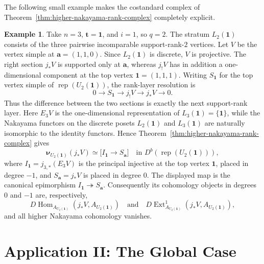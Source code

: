 \documentclass[12pt,reqno]{amsart}
\theoremstyle{definition}
\newtheorem{example}[theorem]{Example}
\theoremstyle{remark}
\newcommand{\Rep}{\operatorname{rep}}
\newcommand{\Hom}{\operatorname{Hom}}
\newcommand{\Ext}{\operatorname{Ext}}
\begin{document}
The following small example makes the costandard complex of
Theorem~\ref{thm:higher-nakayama-rank-complex} completely explicit.

\begin{example}\label{ex:rank-layer-three}
Take $n=3$, $\mathbf t=\mathbf1$, and $i=1$, so $q=2$.  The stratum
$L_2(\mathbf1)$ consists of the three pairwise incomparable support-rank-$2$
vertices.  Let $V$ be the vertex simple at $\mathbf a=(1,1,0)$.  Since
$L_2(\mathbf1)$ is discrete, $V$ is projective.  The right section $j_*V$ is
supported only at $\mathbf a$, whereas $j_!V$ has in addition a
one-dimensional component at the top vertex $\mathbf1=(1,1,1)$.  Writing
$S_{\mathbf1}$ for the top vertex simple of $\Rep(U_2(\mathbf1))$, the
rank-layer resolution is
\[
0\longrightarrow S_{\mathbf1}\longrightarrow j_!V
\longrightarrow j_*V\longrightarrow0.
\]
Thus the difference between the two sections is exactly the next support-rank
layer.  Here $E_3V$ is the one-dimensional representation of
$L_3(\mathbf1)=\{\mathbf1\}$, while the Nakayama functors on the discrete
posets $L_2(\mathbf1)$ and $L_3(\mathbf1)$ are naturally isomorphic to the
identity functors.  Hence
Theorem~\ref{thm:higher-nakayama-rank-complex} gives
\[
\boldsymbol\nu_{U_2(\mathbf1)}(j_*V)
\simeq
\bigl[I_{\mathbf1}\longrightarrow S_{\mathbf a}\bigr]
\quad\text{in }D^b(\Rep(U_2(\mathbf1))),
\]
where $I_{\mathbf1}=j_{3,*}(E_3V)$ is the principal injective at the top
vertex $\mathbf1$, placed in degree $-1$, and $S_{\mathbf a}=j_*V$ is placed
in degree $0$.  The displayed map is the canonical epimorphism
$I_{\mathbf1}\twoheadrightarrow S_{\mathbf a}$.  Consequently its cohomology
objects in degrees $0$ and $-1$ are, respectively,
\[
D\Hom_{A_{U_2(\mathbf1)}}(j_*V,A_{U_2(\mathbf1)})
\quad\text{and}\quad
D\Ext^1_{A_{U_2(\mathbf1)}}(j_*V,A_{U_2(\mathbf1)}),
\]
and all higher Nakayama cohomology vanishes.
\end{example}

\section{Application II: The Global Case}\label{sec:global-recollement-serre}
\end{document}
